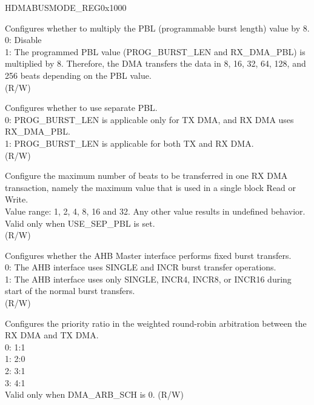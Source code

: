 \addtocounter{Regfloat}{-1}
\begin{register}{H}{DMABUSMODE\_REG}{0x1000}
\begin{regdesc}\begin{reglist}
\item [Continued from the previous page...]

\item [PBLX8\_MODE] Configures whether to multiply the PBL (programmable burst length) value by 8.\\
0: Disable\\
1: The programmed PBL value (PROG\_BURST\_LEN and RX\_DMA\_PBL) is multiplied by 8. Therefore, the DMA transfers the data in 8, 16, 32, 64, 128, and 256 beats depending on the PBL value.\\ (R/W)
\item [USE\_SEP\_PBL] Configures whether to use separate PBL.\\
0: PROG\_BURST\_LEN is applicable only for TX DMA, and RX DMA uses RX\_DMA\_PBL.\\
1: PROG\_BURST\_LEN is applicable for both TX and RX DMA.\\(R/W)
\item [RX\_DMA\_PBL] Configure the maximum number of beats to be transferred in one RX DMA transaction, namely the maximum value that is used in a single block Read or Write.\\
Value range: 1, 2, 4, 8, 16 and 32. Any other value results in undefined behavior.\\
Valid only when USE\_SEP\_PBL is set.\\
(R/W)
\item [FIXED\_BURST] Configures whether the AHB Master interface performs fixed burst transfers.\\
0: The AHB interface uses SINGLE and INCR burst transfer operations.\\
1: The AHB interface uses only SINGLE, INCR4, INCR8, or INCR16 during start of the normal burst transfers.\\ (R/W)
\item [PRI\_RATIO] Configures the priority ratio in the weighted round-robin arbitration between the RX DMA and TX DMA.\\
0: 1:1\\
1: 2:0\\
2: 3:1\\
3: 4:1\\
Valid only when DMA\_ARB\_SCH is 0. (R/W)
\item [PROG\_BURST\_LEN]

\end{reglist}
\end{regdesc}
\end{register}
